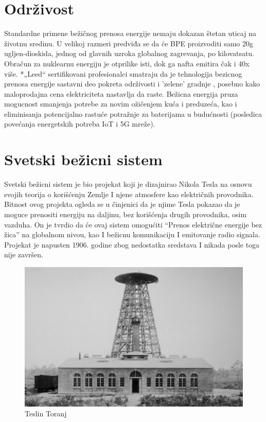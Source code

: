 \documentclass[a4paper]{article}
\begin{document}
\section{Održivost}
\label{sec:Održivost}

Standardne primene bežičnog prenosa energije nemaju dokazan štetan uticaj na životnu sredinu. U velikoj razmeri predviđa se da će BPE proizvoditi samo 20g ugljen-dioskida, jednog od glavnih uzroka globalnog zagrevanja, po kilovatsatu. \cite{a} Obračun za nuklearnu energiju je otprilike isti, dok ga nafta emitira čak i 40x više. *„Leed“ sertifikovani profesionalci smatraju da je tehnologija bezicnog prenosa energije sastavni deo pokreta održivosti i ’zelene’ gradnje \cite{d}, posebno kako maloprodajna cena elektriciteta nastavlja da raste. Bežicna energija pruza mogucnost smanjenja potrebe za novim ožičenjem kuća i preduzeća, kao i eliminisanja potencijalno rastuće potražnje za baterijama u budućnosti (posledica povećanja energetskih potreba IoT i 5G mreže).     


\section{Svetski bežicni sistem}
\label{sec:svetskisistem}
Svetski bežicni sistem je bio projekat koji je dizajnirao Nikola Tesla na osnovu svojih teorija o korišćenju Zemlje I njene atmosfere kao električnih provodnika. Bitnost ovog projekta ogleda se u činjenici da je njime Tesla pokazao da je moguce prenositi energiju na daljinu, bez korišćenja drugih provodnika, osim vazduha. On je tvrdio da će ovaj sistem omogućiti “Prenos električne energije bez žica” na globalnom nivou, kao I bežicnu komunikaciju I emitovanje radio signala. Projekat je napusten 1906. godine zbog nedostatka sredstava I nikada posle toga nije završen.

\begin{figure}[h!]
\begin{center}
\includegraphics[scale=0.25]{toranj.jpg}
\end{center}
\caption{Teslin Toranj}
\label{fig:toranj}
\end{figure}
\end{document}
